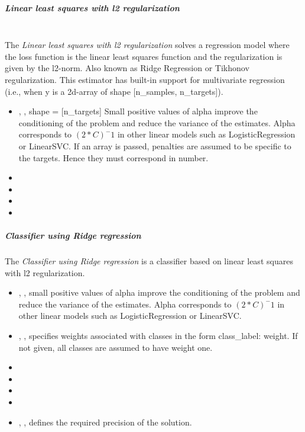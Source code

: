 \subparagraph{Linear least squares with l2 regularization}
\mbox{}
\\The \textit{Linear least squares with l2 regularization} solves a regression
model where the loss function is the linear least squares function and the
regularization is given by the l2-norm.
%
Also known as Ridge Regression or Tikhonov regularization.
%
This estimator has built-in support for multivariate regression (i.e., when y
is a 2d-array of shape [n\_samples, n\_targets]).
%
\begin{itemize}
  \item {}, ,
  shape = [n\_targets] Small positive values of alpha improve the
  conditioning of the problem and reduce the variance of the estimates.
  Alpha corresponds to $(2*C)^-1$ in other linear models such as
  LogisticRegression or LinearSVC.
  If an array is passed, penalties are assumed to be specific to the targets.
  Hence they must correspond in number.
  \item {}
  \item {}
  \item {}
  \item \solverDescription
\end{itemize}

\subparagraph{Classifier using Ridge regression}
\mbox{}

The \textit{Classifier using Ridge regression} is a classifier based on linear
least squares with l2 regularization.

\begin{itemize}
  \item {}, , small positive values of alpha improve
  the conditioning of the problem and reduce the variance of the estimates.
  Alpha corresponds to $(2*C)^-1$ in other linear models such as
  LogisticRegression or LinearSVC.
  \item {}, , specifies
  weights associated with classes in the form {class\_label: weight}.
  If not given, all classes are assumed to have weight one.
  \item {}
  \item {}
  \item {}
  \item \solverDescription
  \item {}, , defines the required precision of the
  solution.
\end{itemize}


